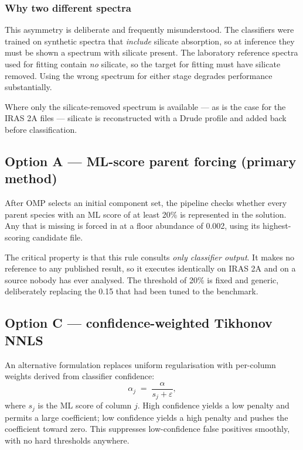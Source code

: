 \documentclass[11pt,a4paper]{article}
\begin{document}
\subsubsection*{Why two different spectra}

This asymmetry is deliberate and frequently misunderstood. The classifiers
were trained on synthetic spectra that \emph{include} silicate absorption,
so at inference they must be shown a spectrum with silicate present. The
laboratory reference spectra used for fitting contain \emph{no} silicate,
so the target for fitting must have silicate removed. Using the wrong
spectrum for either stage degrades performance substantially.

Where only the silicate-removed spectrum is available --- as is the case
for the IRAS 2A files --- silicate is reconstructed with a Drude profile
and added back before classification.

\subsection{Option A --- ML-score parent forcing (primary method)}

After OMP selects an initial component set, the pipeline checks whether
every parent species with an ML score of at least 20\% is represented in
the solution. Any that is missing is forced in at a floor abundance of
0.002, using its highest-scoring candidate file.

The critical property is that this rule consults \emph{only classifier
output}. It makes no reference to any published result, so it executes
identically on IRAS 2A and on a source nobody has ever analysed. The
threshold of 20\% is fixed and generic, deliberately replacing the 0.15
that had been tuned to the benchmark.

\subsection{Option C --- confidence-weighted Tikhonov NNLS}

An alternative formulation replaces uniform regularisation with per-column
weights derived from classifier confidence:
\[
  \alpha_j \;=\; \frac{\alpha}{s_j + \varepsilon},
\]
where $s_j$ is the ML score of column $j$. High confidence yields a low
penalty and permits a large coefficient; low confidence yields a high
penalty and pushes the coefficient toward zero. This suppresses
low-confidence false positives smoothly, with no hard thresholds anywhere.
\end{document}
